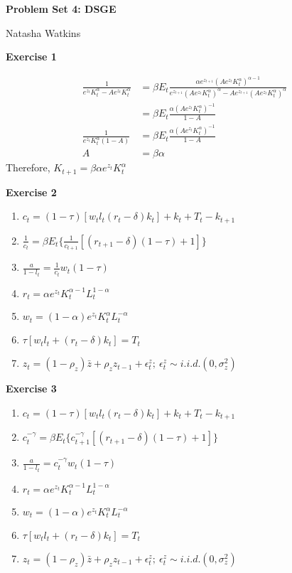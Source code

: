 \documentclass[letterpaper,12pt]{article}
\begin{document}
\textbf{\large Problem Set 4: DSGE}

Natasha Watkins

\vspace{5mm}

\textbf{Exercise 1}

\begin{align*}
\frac{1}{e^{z_t}K_t^\alpha - Ae^{z_t}K_t^\alpha} &=
\beta E_t \frac{\alpha e^{z_{t+1}} (Ae^{z_t}K_t^\alpha)^{\alpha-1} } {e^{z_{t+1}} (Ae^{z_t}K_t^\alpha)^\alpha - Ae^{z_{t+1}}(Ae^{z_t}K_t^\alpha)^\alpha} \\
&= 
\beta E_t \frac{\alpha  (Ae^{z_t}K_t^\alpha)^{-1}}{ 1 - A} \\
\frac{1}{e^{z_t}K_t^\alpha(1 - A)}
&= 
\beta E_t \frac{\alpha  (Ae^{z_t}K_t^\alpha)^{-1}}{ 1 - A} \\
A
&= 
\beta \alpha
\end{align*}
Therefore,
$K_{t+1} = \beta \alpha e^{z_t} K_t^\alpha$

\textbf{Exercise 2}

\begin{enumerate}
	\item $c_t = (1 - \tau)[w_t l_t (r_t - \delta) k_t] + k_t + T_t - k_{t+1}$
	\item $\frac{1}{c_t} = \beta E_t \{\frac{1}{c_{t+1}} [(r_{t+1} - \delta)(1 - \tau) + 1]\}$
	\item $\frac{a}{1 - l_t} = \frac{1}{c_t} w_t (1 - \tau)$
	\item $r_t = \alpha e^{z_t} K_t^{\alpha - 1} L_t^{1 - \alpha}$
	\item $w_t = (1 - \alpha) e^{z_t} K_t^\alpha L_t^{-\alpha}$
	\item $\tau[w_t l_t + (r_t - \delta) k_t] = T_t$
	\item $z_t = (1 - \rho_z) \bar{z} + \rho_z z_{t-1} + \epsilon_t^z; \ \epsilon_t^z \sim i.i.d.(0, \sigma_z^2)$
\end{enumerate}

\textbf{Exercise 3}

\begin{enumerate}
	\item $c_t = (1 - \tau)[w_t l_t (r_t - \delta) k_t] + k_t + T_t - k_{t+1}$
	\item $c_t^{-\gamma} = \beta E_t \{c_{t+1}^{-\gamma} [(r_{t+1} - \delta)(1 - \tau) + 1]\}$
	\item $\frac{a}{1 - l_t} = c_t^{-\gamma} w_t (1 - \tau)$
	\item $r_t = \alpha e^{z_t} K_t^{\alpha - 1} L_t^{1 - \alpha}$
	\item $w_t = (1 - \alpha) e^{z_t} K_t^\alpha L_t^{-\alpha}$
	\item $\tau[w_t l_t + (r_t - \delta) k_t] = T_t$
	\item $z_t = (1 - \rho_z) \bar{z} + \rho_z z_{t-1} + \epsilon_t^z; \ \epsilon_t^z \sim i.i.d.(0, \sigma_z^2)$
\end{enumerate}
\end{document}
